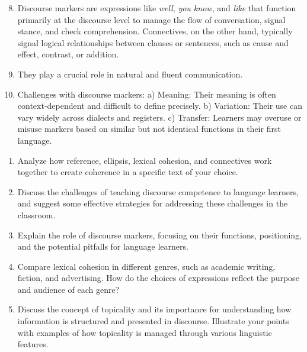 \begin{tcolorbox}[title=Answer Key 8--10, colback=white, colframe=blue!75!black, fonttitle=\bfseries]

\begin{enumerate}[noitemsep]\setcounter{enumi}{7}
    
    \item Discourse markers are expressions like \textit{well}, \textit{you know}, and \textit{like} that function primarily at the discourse level to manage the flow of conversation, signal stance, and check comprehension. Connectives, on the other hand, typically signal logical relationships between clauses or sentences, such as cause and effect, contrast, or addition.
    \item They play a crucial role in natural and fluent communication.
    \item Challenges with discourse markers: a) Meaning: Their meaning is often context-dependent and difficult to define precisely. b) Variation: Their use can vary widely across dialects and registers. c) Transfer: Learners may overuse or misuse markers based on similar but not identical functions in their first language.
\end{enumerate}
\end{tcolorbox}
\begin{tcolorbox}[title=Essay questions, colback=white, colframe=blue!75!black, fonttitle=\bfseries]
\begin{enumerate}[noitemsep]
    \item Analyze how reference, ellipsis, lexical cohesion, and connectives work together to create coherence in a specific text of your choice.
    \item Discuss the challenges of teaching discourse competence to language learners, and suggest some effective strategies for addressing these challenges in the classroom.
    \item Explain the role of discourse markers, focusing on their functions, positioning, and the potential pitfalls for language learners.
    \item Compare lexical cohesion in different genres, such as academic writing, fiction, and advertising. How do the choices of expressions reflect the purpose and audience of each genre?
    \item Discuss the concept of topicality and its importance for understanding how information is structured and presented in discourse. Illustrate your points with examples of how topicality is managed through various linguistic features.
\end{enumerate}
\end{tcolorbox}